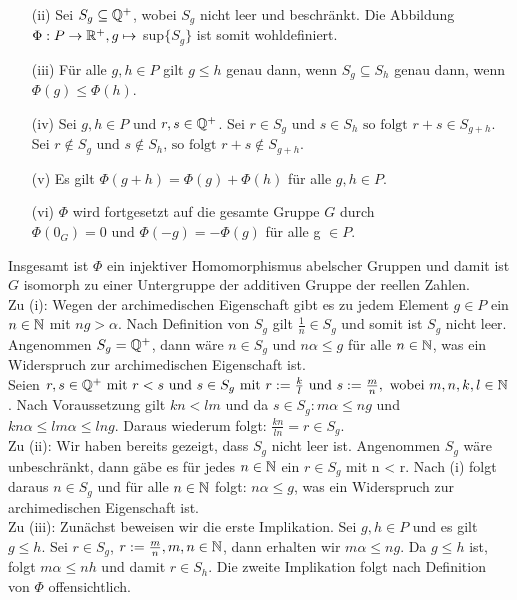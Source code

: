 {\begin{enumerate}
\item[(ii)] Sei $S_g \subseteq \mathbb{Q}^{+}$, wobei $S_g$ nicht leer und beschränkt. Die Abbildung $\Phi: P \rightarrow \mathbb{R}^{+}, g \mapsto$ sup$\lbrace S_g \rbrace$ ist somit wohldefiniert.  
\item[(iii)]Für alle $g, h \in P$ gilt $g \le h $ genau dann, wenn $ S_g \subseteq S_h$ genau dann, wenn $\Phi(g) \le \Phi(h)$.  
\item[(iv)] Sei $g, h \in P$ und $r,s \in \mathbb{Q}^{+}$. Sei $r \in S_g \text{ und } s \in S_h \text{ so folgt } r+s \in S_{g+h}$. \\
Sei $r \notin S_g \text{ und } s \notin S_h \text{, so folgt } r+s \notin S_{g+h}$. 
\item[(v)] Es gilt $\Phi\left( g+h\right) = \Phi\left(g\right) + \Phi\left(h\right)$ für alle $g, h \in P$. 
\item[(vi)] $\Phi$ wird fortgesetzt auf die gesamte Gruppe $G$ durch $\Phi\left(0_G\right) = 0 \text{ und } \Phi \left(-g\right) = -\Phi \left(g\right)$ für alle g $\in P$. \\ 
\end{enumerate}
Insgesamt ist $\Phi$ ein injektiver Homomorphismus abelscher Gruppen und damit ist $G$ isomorph zu einer Untergruppe der additiven Gruppe der reellen Zahlen.\\ 
Zu (i): Wegen der archimedischen Eigenschaft gibt es zu jedem Element $g \in P$ ein $n \in \mathbb{N}$ mit $ng > \alpha$. Nach Definition von $S_g$ gilt $\frac{1}{n} \in S_g$ und somit ist $S_g$ nicht leer.\\ Angenommen $S_g = \mathbb{Q}^{+}$, dann wäre $n \in S_g$ und $n\alpha \le g$ für alle $n\in\mathbb{N}$, was ein Widerspruch zur archimedischen Eigenschaft ist.\\
Seien $r, s \in \mathbb{Q}^{+} \text{ mit } r < s \text{ und } s \in S_g \text { mit } r := \frac{k}{l} \text{ und } s:= \frac{m}{n}, \text{ wobei } m, n ,k, l \in \mathbb{N}$. Nach Voraussetzung gilt $kn < lm $ und da $s \in S_g: m\alpha \le ng$ und $kn\alpha \le lm\alpha \le lng.$ Daraus wiederum folgt: $\frac{kn}{ln} = r \in S_g$.\\
%
%
% 
%
Zu (ii): Wir haben bereits gezeigt, dass $S_g$ nicht leer ist. Angenommen $S_g$ wäre unbeschränkt, dann gäbe es für jedes $n \in \mathbb{N}$ ein $r \in S_g$ mit n < r. Nach (i) folgt daraus $n \in S_g$ und für alle $n \in \mathbb{N}$ folgt: $ n\alpha \le g$, was ein Widerspruch zur archimedischen Eigenschaft ist.\\
%
%
%
%
%
Zu (iii): Zunächst beweisen wir die erste Implikation. Sei  $g, h \in P$ und es gilt $g \le h$. Sei $r \in S_g$, $r:= \frac{m}{n}, m, n \in \mathbb{N} $, dann erhalten wir $m\alpha \le ng$. Da $g \le h$ ist, folgt $ m\alpha \le n h$ und damit $r \in S_h$. Die zweite Implikation folgt nach Definition von $\Phi$ offensichtlich.\\
}
